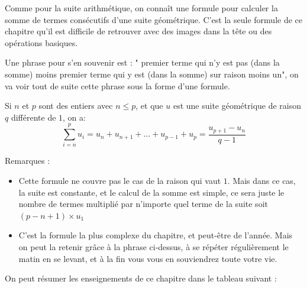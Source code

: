 \documentclass[10pt,a4paper]{book}
\begin{document}
Comme pour la suite arithmétique, on connaît une formule pour calculer la somme de termes consécutifs d'une suite géométrique.
C'est la seule formule de ce chapitre qu'il est difficile de retrouver avec des images dans la tête ou des opérations basiques.

Une phrase pour s'en souvenir est : " premier terme qui n'y est pas (dans la somme) moins premier terme qui y est (dans la somme) sur raison moins un", on va voir tout de suite cette phrase sous la forme d'une formule.

\begin{prop}
    Si $n$ et $p$ sont des entiers avec $n \leq p$, et que $u$ est une suite géométrique de raison $q$ différente de $1$, on a:
    \[  \sum_{i=n}^{p} u_i= u_n + u_{n+1} + \ldots  + u_{p-1} + u_p = \frac{u_{p+1} - u_n}{q-1}    \]
\end{prop}

Remarques : \begin{itemize}
    \item Cette formule ne couvre pas le cas de la raison qui vaut $1$. Mais dans ce cas, la suite est constante, et le calcul de la somme est simple, ce sera juste le nombre de termes multiplié par n'importe quel terme de la suite soit $(p-n+1) \times u_1$
    \item C'est la formule la plus complexe du chapitre, et peut-être de l'année. Mais on peut la retenir grâce à la phrase ci-dessus, à se répéter régulièrement le matin en se levant, et à la fin vous vous en souviendrez toute votre vie.
\end{itemize} 


On peut résumer les enseignements de ce chapitre dans le tableau suivant :
\end{document}
